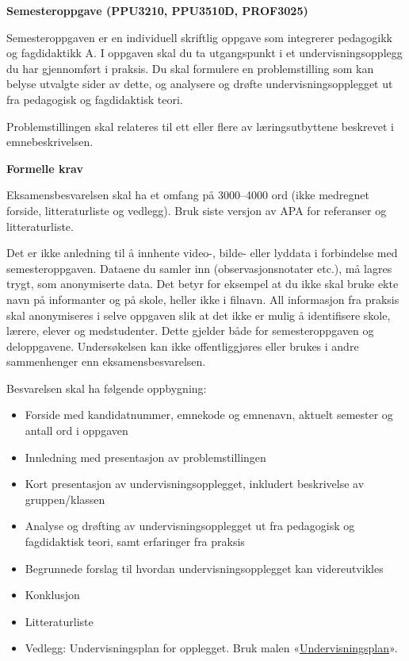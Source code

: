 \documentclass[12pt,a4paper]{article}
\begin{document}
\setcounter{page}{0}
\begingroup
\small
\setlength{\parindent}{0pt}
\setlength{\parskip}{0.45\baselineskip}

{\large\bfseries Semesteroppgave (PPU3210, PPU3510D, PROF3025)\par}

Semesteroppgaven er en individuell skriftlig oppgave som integrerer pedagogikk og fagdidaktikk A. I oppgaven skal du ta utgangspunkt i et undervisningsopplegg du har gjennomført i praksis. Du skal formulere en problemstilling som kan belyse utvalgte sider av dette, og analysere og drøfte undervisningsopplegget ut fra pedagogisk og fagdidaktisk teori.

Problemstillingen skal relateres til ett eller flere av læringsutbyttene beskrevet i emnebeskrivelsen.

\textbf{Formelle krav}

Eksamensbesvarelsen skal ha et omfang på 3000--4000 ord (ikke medregnet forside, litteraturliste og vedlegg). Bruk siste versjon av APA for referanser og litteraturliste.

Det er ikke anledning til å innhente video-, bilde- eller lyddata i forbindelse med semesteroppgaven. Dataene du samler inn (observasjonsnotater etc.), må lagres trygt, som anonymiserte data. Det betyr for eksempel at du ikke skal bruke ekte navn på informanter og på skole, heller ikke i filnavn. All informasjon fra praksis skal anonymiseres i selve oppgaven slik at det ikke er mulig å identifisere skole, lærere, elever og medstudenter. Dette gjelder både for semesteroppgaven og deloppgavene. Undersøkelsen kan ikke offentliggjøres eller brukes i andre sammenhenger enn eksamensbesvarelsen.

Besvarelsen skal ha følgende oppbygning:
\begin{itemize}
    \setlength{\itemsep}{0pt}
    \setlength{\parsep}{0pt}
    \item Forside med kandidatnummer, emnekode og emnenavn, aktuelt semester og antall ord i oppgaven
    \item Innledning med presentasjon av problemstillingen
    \item Kort presentasjon av undervisningsopplegget, inkludert beskrivelse av gruppen/klassen
    \item Analyse og drøfting av undervisningsopplegget ut fra pedagogisk og fagdidaktisk teori, samt erfaringer fra praksis
    \item Begrunnede forslag til hvordan undervisningsopplegget kan videreutvikles
    \item Konklusjon
    \item Litteraturliste
    \item Vedlegg: Undervisningsplan for opplegget. Bruk malen «\href{https://www.uv.uio.no/ils/studier/praksis/undervisningsplan.html}{Undervisningsplan}».
\end{itemize}
\end{document}
